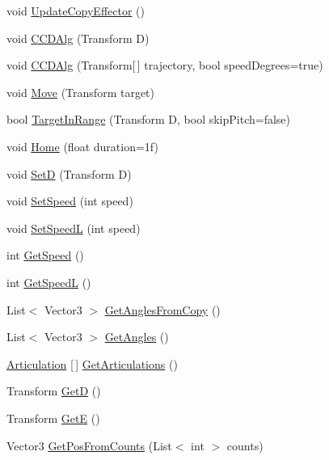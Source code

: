 \begin{DoxyCompactItemize}
\item 
void \mbox{\hyperlink{class_i_k_a1bd362c7864cb7e81a09cfc03a9b9151}{Update\+Copy\+Effector}} ()
\item 
void \mbox{\hyperlink{class_i_k_aa28704730e12709936ba319e326a4173}{C\+C\+D\+Alg}} (Transform D)
\item 
void \mbox{\hyperlink{class_i_k_a647580fce8d20924d081e6c056495e95}{C\+C\+D\+Alg}} (Transform\mbox{[}$\,$\mbox{]} trajectory, bool speed\+Degrees=true)
\item 
void \mbox{\hyperlink{class_i_k_a9959bf459122a560124c9aac8191cbe6}{Move}} (Transform target)
\item 
bool \mbox{\hyperlink{class_i_k_ad97122f89dfb2c5bff5605cbcf5c5cc7}{Target\+In\+Range}} (Transform D, bool skip\+Pitch=false)
\item 
void \mbox{\hyperlink{class_i_k_a1a8f3eb230e800c10dec985b81623121}{Home}} (float duration=1f)
\item 
void \mbox{\hyperlink{class_i_k_aa97be23f240e84f80c9d1709877e46f4}{SetD}} (Transform D)
\item 
void \mbox{\hyperlink{class_i_k_af3fe9338cf146836289725c4d7f001ff}{Set\+Speed}} (int speed)
\item 
void \mbox{\hyperlink{class_i_k_afc1472fadfc08f9df7374af09ca83110}{Set\+SpeedL}} (int speed)
\item 
int \mbox{\hyperlink{class_i_k_a4560c82ff2f46414e095e7fb37283f39}{Get\+Speed}} ()
\item 
int \mbox{\hyperlink{class_i_k_ae3121a6a82a3ae9216c480d4e9f117a9}{Get\+SpeedL}} ()
\item 
List$<$ Vector3 $>$ \mbox{\hyperlink{class_i_k_a041e3cba939af2806b7af200edf3161c}{Get\+Angles\+From\+Copy}} ()
\item 
List$<$ Vector3 $>$ \mbox{\hyperlink{class_i_k_a47ceb1a675024943c1714072b1b0d01f}{Get\+Angles}} ()
\item 
\mbox{\hyperlink{class_articulation}{Articulation}} \mbox{[}$\,$\mbox{]} \mbox{\hyperlink{class_i_k_ae8f0fe38cdc7d2280fc4c9343176810a}{Get\+Articulations}} ()
\item 
Transform \mbox{\hyperlink{class_i_k_aa7d322903f3e24412e87ec8b8f9281a0}{GetD}} ()
\item 
Transform \mbox{\hyperlink{class_i_k_a706f81d48d5c7d00791a78b8d09e923e}{GetE}} ()
\item 
Vector3 \mbox{\hyperlink{class_i_k_a265ad7e93d155fb6183a60baa8d97b4d}{Get\+Pos\+From\+Counts}} (List$<$ int $>$ counts)
\end{DoxyCompactItemize}
